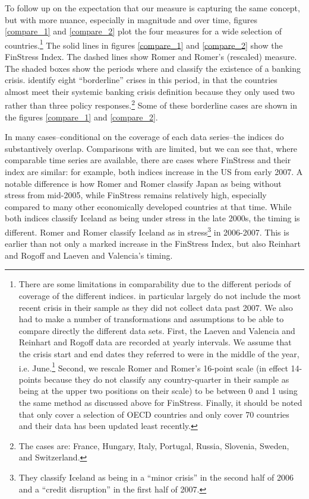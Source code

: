 \documentclass[]{article}
\begin{document}
To follow up on the expectation that our measure is capturing the same concept, but with more nuance, especially in magnitude and over time, figures \ref{compare_1} and \ref{compare_2} plot the four measures for a wide selection of countries.\footnote{There are some limitations in comparability due to the different periods of coverage of the different indices. \cite{Romer2015} in particular largely do not include the most recent crisis in their sample as they did not collect data past 2007. We also had to make a number of transformations and assumptions to be able to  compare directly the different data sets. First, the Laeven and Valencia and Reinhart and Rogoff data are recorded at yearly intervals. We assume that the crisis start and end dates they referred to were in the middle of the year, i.e. June.\footnote{In the period covered in figures \ref{compare_1} and \ref{compare_2} this improves their fit with events, as many of the 2008 crises became especially apparent after Lehman Brothers collapse in September 2008.} Second, we rescale Romer and Romer's 16-point scale (in effect 14-points because they do not classify any country-quarter in their sample as being at the upper two positions on their scale) to be between 0 and 1 using the same method as discussed above for FinStress. Finally, it should be noted that \cite{Romer2015} only cover a selection of OECD countries and \cite{Reinhart2009} only cover 70 countries and their data has been updated least recently.} The solid lines in figures \ref{compare_1} and \ref{compare_2} show the FinStress Index. The dashed lines show Romer and Romer's (rescaled) measure. The shaded boxes show the periods where \cite{laeven2013} and \cite{Reinhart2009} classify the existence of a banking crisis. \cite{laeven2013} identify eight ``borderline'' crises in this period, in that the countries almost meet their systemic banking crisis definition because they only used two rather than three policy responses.\footnote{The cases are: France, Hungary, Italy, Portugal, Russia, Slovenia, Sweden, and Switzerland.} Some of these borderline cases are shown in the figures \ref{compare_1} and \ref{compare_2}.

In many cases--conditional on the coverage of each data series--the indices do substantively overlap. Comparisons with \cite{Romer2015} are limited, but we can see that, where comparable time series are available, there are cases where FinStress and their index are similar: for example, both indices increase in the US from early 2007. A notable difference is how Romer and Romer classify Japan as being without stress from mid-2005, while FinStress remains relatively high, especially compared to many other economically developed countries at that time. While both indices classify Iceland as being under stress in the late 2000s, the timing is different. Romer and Romer classify Iceland as in stress\footnote{They classify Iceland as being in a ``minor crisis'' in the second half of 2006 and a ``credit  disruption'' in the first half of 2007.} in 2006-2007. This is earlier than not only a marked increase in the FinStress Index, but also Reinhart and Rogoff and Laeven and Valencia's timing.
\end{document}
